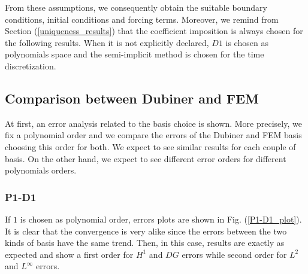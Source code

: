 \documentclass[a4paper,11pt]{article}
\begin{document}
\noindent From these assumptions, we consequently obtain the suitable boundary conditions, initial conditions and forcing terms. Moreover, we remind from Section (\ref{uniqueness_results}) that the coefficient imposition is always chosen for the following results. When it is not explicitly declared, $D1$ is chosen as polynomials space and the semi-implicit method is chosen for the time discretization.

\subsection{Comparison between Dubiner and FEM}
At first, an error analysis related to the basis choice is shown. More precisely, we fix a polynomial order and we compare the errors of the Dubiner and FEM basis choosing this order for both. We expect to see similar results for each couple of basis. On the other hand, we expect to see different error orders for different polynomials orders.
\subsubsection{P1-D1}
If $1$ is chosen as polynomial order, errors plots are shown in Fig. (\ref{P1-D1_plot}). 
\noindent It is clear that the convergence is very alike since the errors between the two kinds of basis have the same trend. Then, in this case, results are exactly as expected and show a first order for $H^1$ and $DG$ errors while second order for $L^2$ and $L^\infty$ errors.
\end{document}
